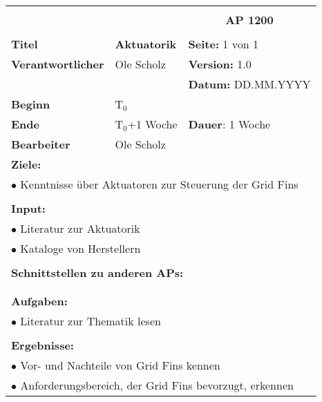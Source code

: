 \clearpage
\begin{table}[!h]
	\begin{center}
		\begin{tabular}{|p{35mm}||p{55mm}|p{50mm}||p{40mm}|}
			\hline
			\multicolumn{3}{|l||}{\textbf{}} & \multicolumn{1}{c|}{}\\
			\multicolumn{3}{|l||}{\textbf{}} & \multicolumn{1}{c|}{\textbf{AP 1200}}\\
			\multicolumn{3}{|l||}{\textbf{}} & \multicolumn{1}{c|}{}\\
			\hline\hline
			\textbf{Titel} & \multicolumn{2}{p{7cm}||}{\textbf{Aktuatorik}} 
			& \textbf{Seite:} 1 von 1\\
			\hline
			\textbf{Verantwortlicher} & \multicolumn{2}{l||}{Ole Scholz} & \textbf{Version:} 1.0\\
			\hline
			\multicolumn{3}{|l||}{} & \textbf{Datum:} DD.MM.YYYY\\
			\hline\hline
			\textbf{Beginn} & \multicolumn{2}{l||}{T$_0$} & \\
			\hline
			\textbf{Ende} & \multicolumn{2}{l||}{T$_0$+1 Woche} & \textbf{Dauer}: 1 Woche\\
			\hline\hline
			\textbf{Bearbeiter} & \multicolumn{3}{l|}{Ole Scholz}\\
			\hline\hline
			\multicolumn{4}{|p{150mm}|}{\textbf{Ziele:}}\\
			\multicolumn{4}{|p{150mm}|}{$\bullet$ Kenntnisse über Aktuatoren zur Steuerung der Grid Fins}\\
			\multicolumn{4}{|p{150mm}|}{}\\
			\multicolumn{4}{|p{150mm}|}{\textbf{Input:}}\\
			\multicolumn{4}{|p{150mm}|}{$\bullet$ Literatur zur Aktuatorik}\\
			\multicolumn{4}{|p{150mm}|}{$\bullet$ Kataloge von Herstellern}\\
			\multicolumn{4}{|p{150mm}|}{}\\
			\multicolumn{4}{|p{150mm}|}{\textbf{Schnittstellen zu anderen APs:}}\\
			\multicolumn{4}{|p{150mm}|}{}\\
			\multicolumn{4}{|p{150mm}|}{}\\
			\multicolumn{4}{|p{150mm}|}{\textbf{Aufgaben:}}\\
			\multicolumn{4}{|p{150mm}|}{$\bullet$ Literatur zur Thematik lesen}\\
			\multicolumn{4}{|p{150mm}|}{}\\
			\multicolumn{4}{|p{150mm}|}{\textbf{Ergebnisse:}}\\
			\multicolumn{4}{|p{150mm}|}{$\bullet$ Vor- und Nachteile von Grid Fins kennen}\\
			\multicolumn{4}{|p{150mm}|}{$\bullet$ Anforderungsbereich, der Grid Fins bevorzugt, erkennen}\\
			\hline
		\end{tabular}
	\end{center}
\end{table}


